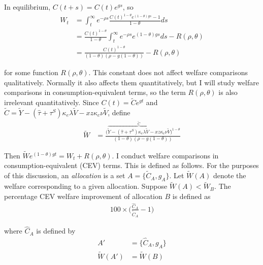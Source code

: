 \documentclass[11pt,english]{article}
\begin{document}
In equilibrium, $C(t+s) = C(t) e^{gs}$, so
\begin{align}
	W_t &= \int_t^{\infty} e^{-\rho s} \frac{C(t)^{1-\theta} e^{(1-\theta)gs} - 1}{1-\theta} ds \nonumber \\
		&= \frac{C(t)^{1-\theta}}{1-\theta} \int_t^{\infty} e^{-\rho s} e^{(1-\theta) g s} ds - R(\rho,\theta) \nonumber \\
		&= \frac{C(t)^{1-\theta} }{(1-\theta)(\rho - g(1-\theta))} - R(\rho,\theta)
\end{align}

for some function $R(\rho,\theta)$. This constant does not affect welfare comparisons qualitatively. Normally it also affects them quantitatively, but I will study welfare comparisons in consumption-equivalent terms, so the term $R(\rho,\theta)$ is also irrelevant quantitatively. Since $C(t) = \tilde{C}e^{gt}$ and $\tilde{C} = \tilde{Y} - (\hat{\tau} + \tau^S) \kappa_e \lambda \tilde{V} - x z \kappa_c \nu \tilde{V}$, define
\begin{align}
\tilde{W} &= \frac{\big(\overbrace{\tilde{Y} - (\hat{\tau} + \tau^S) \kappa_{e} \lambda \tilde{V} - x z \kappa_c \nu \tilde{V}}^{\tilde{C}}\big)^{1-\theta}}{(1-\theta)(\rho - g(1-\theta))} \label{eq:agg_welfare}
\end{align}

Then $\tilde{W} e^{(1-\theta)gt}  = W_t + R(\rho,\theta)$. I conduct welfare comparisons in consumption-equivalent (CEV) terms. This is defined as follows. For the purposes of this discussion, an \textit{allocation} is a set $A = \{ \tilde{C}_A, g_A \}$. Let $\tilde{W}(A)$ denote the welfare corresponding to a given allocation. Suppose $\tilde{W}(A) < \tilde{W}_B$. The percentage CEV welfare improvement of allocation $B$ is defined as 
\begin{align}
	100 \times \big(\frac{\hat{C}_A}{\tilde{C}_A} - 1 \big) 
\end{align}

where $\hat{C}_A$ is defined by 
\begin{align}
	A' &= \{\hat{C}_A, g_A\} \\
	\tilde{W} ( A' ) &= \tilde{W} ( B ) 
\end{align}
\end{document}
